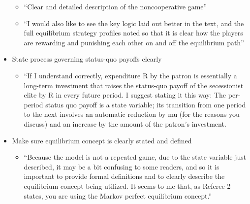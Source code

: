 \documentclass[12pt]{article}
\begin{document}
\begin{itemize}
		\begin{itemize}
			\item ``Clear and detailed description of the noncooperative game''
			\item ``I would also like to see the key logic laid out better in the text, and the full
equilibrium strategy profiles noted so that it is clear how the players are rewarding and punishing each other on and off the equilibrium path''
		\end{itemize}
	\item State process governing status-quo payoffs clearly
		\begin{itemize}
			\item ``If I understand correctly, expenditure R by the patron is essentially a long-term investment that raises the status-quo payoff of the secessionist elite by R in every future period. I suggest stating it this way: The per-period status quo payoff is a state variable; its transition from one period to the next involves an automatic reduction by mu (for the reasons you discuss) and an increase by the amount of the patron's investment.
		\end{itemize}
	\item Make sure equilibrium concept is clearly stated and defined
		\begin{itemize}
			\item ``Because the model is not a repeated game, due to the state variable just described, it may be a bit confusing to some readers, and so it is important to provide formal definitions and to clearly describe the equilibrium concept being utilized. It seems to me that, as Referee 2 states, you are using the Markov perfect equilibrium concept.''
		\end{itemize}
\end{itemize}
\end{document}
